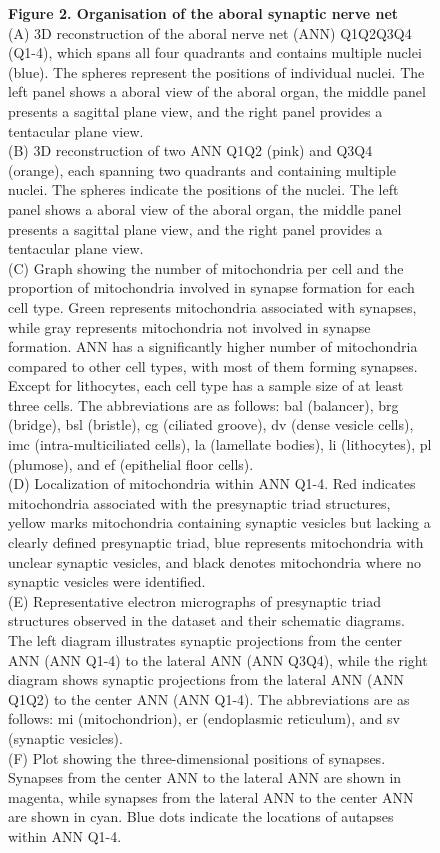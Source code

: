 \documentclass[
  11pt,
]{article}
\begin{document}
\begin{figure}[H]
\caption{\textbf{Figure 2. Organisation of the aboral synaptic nerve
net}\\
(A) 3D reconstruction of the aboral nerve net (ANN) Q1Q2Q3Q4 (Q1-4),
which spans all four quadrants and contains multiple nuclei (blue). The
spheres represent the positions of individual nuclei. The left panel
shows a aboral view of the aboral organ, the middle panel presents a
sagittal plane view, and the right panel provides a tentacular plane
view.\\
(B) 3D reconstruction of two ANN Q1Q2 (pink) and Q3Q4 (orange), each
spanning two quadrants and containing multiple nuclei. The spheres
indicate the positions of the nuclei. The left panel shows a aboral view
of the aboral organ, the middle panel presents a sagittal plane view,
and the right panel provides a tentacular plane view.\\
(C) Graph showing the number of mitochondria per cell and the proportion
of mitochondria involved in synapse formation for each cell type. Green
represents mitochondria associated with synapses, while gray represents
mitochondria not involved in synapse formation. ANN has a significantly
higher number of mitochondria compared to other cell types, with most of
them forming synapses. Except for lithocytes, each cell type has a
sample size of at least three cells. The abbreviations are as follows:
bal (balancer), brg (bridge), bsl (bristle), cg (ciliated groove), dv
(dense vesicle cells), imc (intra-multiciliated cells), la (lamellate
bodies), li (lithocytes), pl (plumose), and ef (epithelial floor
cells).\\
(D) Localization of mitochondria within ANN Q1-4. Red indicates
mitochondria associated with the presynaptic triad structures, yellow
marks mitochondria containing synaptic vesicles but lacking a clearly
defined presynaptic triad, blue represents mitochondria with unclear
synaptic vesicles, and black denotes mitochondria where no synaptic
vesicles were identified.\\
(E) Representative electron micrographs of presynaptic triad structures
observed in the dataset and their schematic diagrams. The left diagram
illustrates synaptic projections from the center ANN (ANN Q1-4) to the
lateral ANN (ANN Q3Q4), while the right diagram shows synaptic
projections from the lateral ANN (ANN Q1Q2) to the center ANN (ANN
Q1-4). The abbreviations are as follows: mi (mitochondrion), er
(endoplasmic reticulum), and sv (synaptic vesicles).\\
(F) Plot showing the three-dimensional positions of synapses. Synapses
from the center ANN to the lateral ANN are shown in magenta, while
synapses from the lateral ANN to the center ANN are shown in cyan. Blue
dots indicate the locations of autapses within ANN Q1-4.}

\end{figure}%
\end{document}
